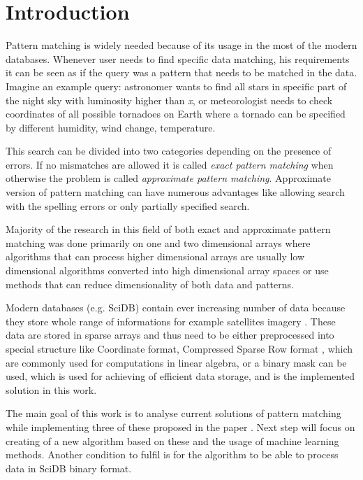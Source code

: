 
\chapter{Introduction}
Pattern matching is widely needed because of its usage in the most of the modern databases. Whenever user needs to find specific data matching, his requirements it can be seen as if the query was a pattern that needs to be matched in the data. Imagine an example query: astronomer wants to find all stars in specific part of the night sky with luminosity higher than \textit{x}, or meteorologist needs to check coordinates of all possible tornadoes on Earth where a tornado can be specified by different humidity, wind change, temperature. \cite{detectRivers}

This search can be divided into two categories depending on the presence of errors. If no mismatches are allowed it is called \textit{exact pattern matching} when otherwise the problem is called \textit{approximate pattern matching}. Approximate version of pattern matching can have numerous advantages like allowing search with the spelling errors or only partially specified search. 

Majority of the research in this field of both exact and approximate pattern matching was done primarily on one and two dimensional arrays where algorithms that can process higher dimensional arrays are usually low dimensional algorithms converted into high dimensional array spaces or use methods that can reduce dimensionality of both data and patterns.

Modern databases (e.g. SciDB) contain ever increasing number of data because they store whole range of informations for example satellites imagery \cite{scidbarch}. These data are stored in sparse arrays and thus need to be either preprocessed into special structure like Coordinate format, Compressed Sparse Row format \cite{saad1990sparskit}, which are commonly used for computations in linear algebra, or a binary mask can be used, which is used for achieving of efficient data storage, and is the implemented solution in this work.

The main goal of this work is to analyse current solutions of pattern matching while implementing three of these proposed in the paper \cite{mdApproxPM}. Next step will focus on creating of a new algorithm based on these and the usage of machine learning methods. Another condition to fulfil is for the algorithm to be able to process data in SciDB binary format. 

